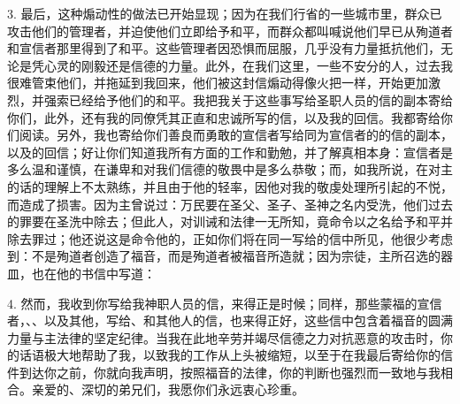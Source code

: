 3. 最后，这种煽动性的做法已开始显现；因为在我们行省的一些城市里，群众已攻击他们的管理者，并迫使他们立即给予和平，而群众都叫喊说他们早已从殉道者和宣信者那里得到了和平。这些管理者因恐惧而屈服，几乎没有力量抵抗他们，无论是凭心灵的刚毅还是信德的力量。此外，在我们这里，一些不安分的人，过去我很难管束他们，并拖延到我回来，他们被这封信煽动得像火把一样，开始更加激烈，并强索已经给予他们的和平。我把我关于这些事写给圣职人员的信的副本寄给你们，此外，还有我的同僚凭其正直和忠诚所写的信，以及我的回信。我都寄给你们阅读。另外，我也寄给你们善良而勇敢的宣信者写给同为宣信者的的信的副本，以及的回信；好让你们知道我所有方面的工作和勤勉，并了解真相本身：宣信者是多么温和谨慎，在谦卑和对我们信德的敬畏中是多么恭敬；而，如我所说，在对主的话的理解上不太熟练，并且由于他的轻率，因他对我的敬虔处理所引起的不悦，而造成了损害。因为主曾说过：万民要在圣父、圣子、圣神之名内受洗，他们过去的罪要在圣洗中除去；但此人，对训诫和法律一无所知，竟命令以之名给予和平并除去罪过；他还说这是命令他的，正如你们将在同一写给的信中所见，他很少考虑到：不是殉道者创造了福音，而是殉道者被福音所造就；因为宗徒，主所召选的器皿，也在他的书信中写道：\par

4. 然而，我收到你写给我神职人员的信，来得正是时候；同样，那些蒙福的宣信者，、、以及其他，写给、和其他人的信，也来得正好，这些信中包含着福音的圆满力量与主法律的坚定纪律。当我在此地辛劳并竭尽信德之力对抗恶意的攻击时，你的话语极大地帮助了我，以致我的工作从上头被缩短，以至于在我最后寄给你的信件到达你之前，你就向我声明，按照福音的法律，你的判断也强烈而一致地与我相合。亲爱的、深切的弟兄们，我愿你们永远衷心珍重。\par



